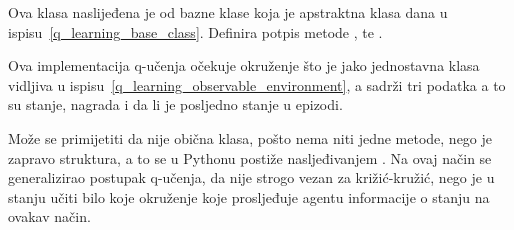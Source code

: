 
Ova klasa naslijeđena je od bazne klase  koja je apstraktna klasa dana u ispisu~\ref{q_learning_base_class}. Definira potpis metode ,  te . 

Ova implementacija q-učenja očekuje okruženje  što je jako jednostavna klasa vidljiva u ispisu~\ref{q_learning_observable_environment}, a sadrži tri podatka a to su stanje, nagrada i da li je posljedno stanje u epizodi.


Može se primijetiti da nije obična klasa, pošto nema niti jedne metode, nego je zapravo struktura, a to se u Pythonu postiže nasljeđivanjem . Na ovaj način se generalizirao postupak q-učenja, da nije strogo vezan za križić-kružić, nego je u stanju učiti bilo koje okruženje koje prosljeđuje agentu informacije o stanju na ovakav način.

